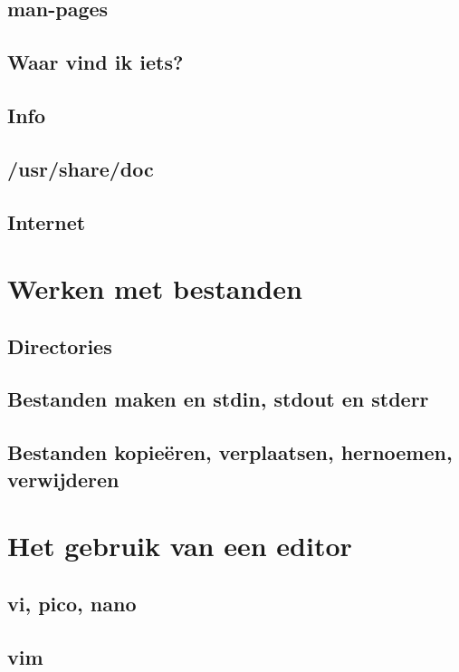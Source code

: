 \documentclass[a4paper,12pt,twoside,openright,titlepage]{book}
\begin{document}
\section{man-pages}

\section{Waar vind ik iets?}

\section{Info}

\section{/usr/share/doc}

\section{Internet}


\chapter{Werken met bestanden}

\section{Directories}

\section{Bestanden maken en stdin, stdout en stderr}

\section{Bestanden kopie\"eren, verplaatsen, hernoemen, verwijderen}


\chapter{Het gebruik van een editor}

\section{vi, pico, nano}

\section{vim}

\end{document}
